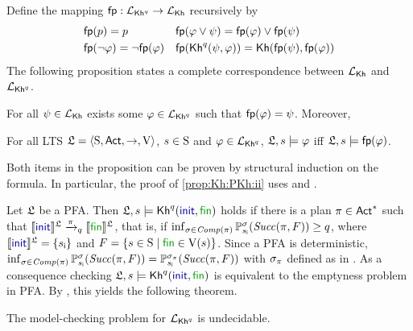 Define the mapping $\fgetprob:\PKh\to\Khlogic$ recursively by
%
\begin{align*}
  & \fgetprob(p) = p
  && \fgetprob(\varphi \vee \psi) = \fgetprob(\varphi) \vee \fgetprob(\psi)\\
  & \fgetprob(\neg \varphi) = \neg \fgetprob(\varphi)
  && \fgetprob(\kh^q(\psi,\varphi)) = \kh(\fgetprob(\psi),\fgetprob(\varphi))
\end{align*}
%
The following proposition states a complete correspondence between
$\Khlogic$ and $\PKh$.
%
%
\begin{proposition}\label{prop:Kh:PKh}
  \begin{enumerate*}[(1)]
  \item\label{prop:Kh:PKh:i}%
    For all $\psi\in\Khlogic$ exists some
    $\varphi\in\PKh$ such that $\fgetprob(\varphi)=\psi$.
    Moreover,
  \item\label{prop:Kh:PKh:ii}%
    For all LTS $\model = \tup{\S,\Act,\ra,\V}$, $s\in\S$ and
    $\varphi\in\PKh$,
    $\model,s\models\varphi$ iff $\model,s\models\fgetprob(\varphi)$.
  \end{enumerate*}
\end{proposition}

Both items in the proposition can be proven by structural induction on
the formula. In particular, the proof of \cref{prop:Kh:PKh:ii} uses
 and .


Let $\model$ be a PFA. Then $\model,s\models\kh^q(\init,\fin)$ holds
if there is a plan $\plan\in \Act^*$ such that
$\truthset{\model}{\init}\reach{\plan}_q\truthset{\model}{\fin}$, that
is, if
$\inf_{\strat\in\Comp(\plan)}\Prob^\strat_{s_{\textsf{i}}}(\Succ(\plan,F)) \geq q$,
where $\truthset{\model}{\init}=\{s_{\textsf{i}}\}$ and
$F=\{{s\in\S}\mid{\fin\in\V(s)}\}$.
%
Since a PFA is deterministic,
$\inf_{\strat\in\Comp(\plan)}\Prob^\strat_{s_{\textsf{i}}}(\Succ(\plan,F)) =
\Prob^{\strat_\plan}_{s_{\textsf{i}}}(\Succ(\plan,F))$
with $\strat_\plan$ defined as in .
%
As a consequence checking $\model,s\models\kh^q(\init,\fin)$ is
equivalent to the emptyness problem in PFA.  By
, this yields the following theorem.

\begin{theorem}\label{th:mc:PKh:undecidable}
  The model-checking problem for $\PKh$ is undecidable.
\end{theorem}




